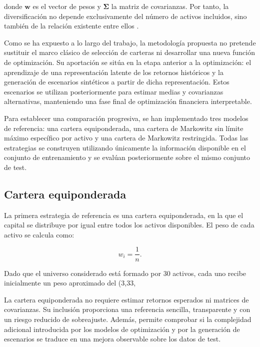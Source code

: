 donde \(\mathbf{w}\) es el vector de pesos y \(\boldsymbol{\Sigma}\) la matriz de covarianzas. Por tanto, la diversificación no depende exclusivamente del número de activos incluidos, sino también de la relación existente entre ellos \cite{markowitz1952}.

Como se ha expuesto a lo largo del trabajo, la metodología propuesta no pretende sustituir el marco clásico de selección de carteras ni desarrollar una nueva función de optimización. Su aportación se sitúa en la etapa anterior a la optimización: el aprendizaje de una representación latente de los retornos históricos y la generación de escenarios sintéticos a partir de dicha representación. Estos escenarios se utilizan posteriormente para estimar medias y covarianzas alternativas, manteniendo una fase final de optimización financiera interpretable.

Para establecer una comparación progresiva, se han implementado tres modelos de referencia: una cartera equiponderada, una cartera de Markowitz sin límite máximo específico por activo y una cartera de Markowitz restringida. Todas las estrategias se construyen utilizando únicamente la información disponible en el conjunto de entrenamiento y se evalúan posteriormente sobre el mismo conjunto de test.

\subsection{Cartera equiponderada}

La primera estrategia de referencia es una cartera equiponderada, en la que el capital se distribuye por igual entre todos los activos disponibles. El peso de cada activo se calcula como:

\begin{equation}
w_i = \frac{1}{n}.
\end{equation}

Dado que el universo considerado está formado por 30 activos, cada uno recibe inicialmente un peso aproximado del (3{,}33,%

La cartera equiponderada no requiere estimar retornos esperados ni matrices de covarianzas. Su inclusión proporciona una referencia sencilla, transparente y con un riesgo reducido de sobreajuste. Además, permite comprobar si la complejidad adicional introducida por los modelos de optimización y por la generación de escenarios se traduce en una mejora observable sobre los datos de test.

